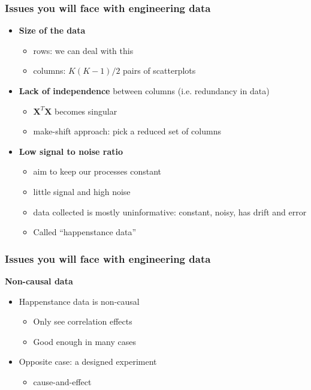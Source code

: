 \begin{frame}\frametitle{Issues you will face with engineering data}
	\begin{itemize}
		\item	\textbf{Size of the data}
		\begin{itemize}
			\item	rows: we can deal with this
			\item	columns: $K(K-1)/2$ pairs of scatterplots
		\end{itemize}
		\item	\textbf{Lack of independence} between columns (i.e. redundancy in data)
		\begin{itemize}
			\item	$\mathbf{X}^T\mathbf{X}$ becomes singular
			\item	make-shift approach: pick a reduced set of columns
		\end{itemize}
		\item	\textbf{Low signal to noise ratio}
		\begin{itemize}
			\item	aim to keep our processes constant
			\item	little signal and high noise
			\item	data collected is mostly uninformative: constant, noisy, has drift and error
			\item	Called ``happenstance data''
		\end{itemize}
	\end{itemize}
\end{frame}

\begin{frame}\frametitle{Issues you will face with engineering data}

	\textbf{Non-causal data}
	\begin{itemize}
		\item	Happenstance data is non-causal
		\begin{itemize}
			\item	Only see correlation effects
			\item	Good enough in many cases
		\end{itemize}
		\item	Opposite case: a designed experiment
		\begin{itemize}
			\item	cause-and-effect
		\end{itemize}
	\end{itemize}
\end{frame}

